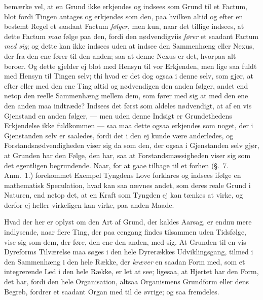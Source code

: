 \documentclass[12pt,a4paper]{book}
\newcommand{\apage}[1]{\marginnote{\footnotesize\textit{[#1]}}}
\begin{document}
bemærke vel, at en Grund ikke erkjendes og indsees som Grund til et Factum, blot
fordi Tingen antages og erkjendes som den, paa hvilken altid og efter en \apage{94} bestemt
Regel et saadant Factum \emph{følger}, men kun, naar det tillige indsees, at dette Factum
\emph{maa} følge paa den, fordi den nødvendigviis \emph{fører} et saadant Factum \emph{med sig}; og
dette kan ikke indsees uden at indsee den Sammenhæng eller Nexus, der fra den ene
fører til den anden; saa at denne Nexus er det, hvorpaa alt beroer. Og dette
gjelder ej blot med Hensyn til vor Erkjenden, men lige saa fuldt med Hensyn til
Tingen selv; thi hvad er det dog ogsaa i denne selv, som gjør, at efter eller med
den ene Ting altid og nødvendigen den anden følger, andet end netop den reelle
Sammenhæng mellem dem, som fører med sig at med den ene den anden maa indtræde?
Indsees det først som aldeles nødvendigt, at af en vis Gjenstand en anden følger,
--- men uden denne Indsigt er Grundethedens Erkjendelse ikke fuldkommen --- saa
maa dette ogsaa erkjendes som noget, der i Gjenstanden selv er saaledes, fordi det
i den ej kunde være anderledes, og Forstandsnødvendigheden viser sig da som den,
der ogsaa i Gjenstanden selv gjør, at Grunden har den Følge, den har, saa at
Forstandsmæssigheden viser sig som det egentligen begrundende. Naar, for at gaae
tilbage til et forhen (§.~7. Anm.~1.) forekommet Exempel Tyngdens Love forklares
og indsees ifølge en mathematisk Speculation, hvad kan saa nævnes andet, som
deres reale Grund i Naturen, end netop det, at en  \apage{95} Kraft som Tyngden ej kan tænkes
at virke, og derfor ej heller virkeligen kan virke, paa anden Maade.

Hvad der her er oplyst om den Art af Grund, der kaldes Aarsag, er endnu mere
indlysende, naar flere Ting, der paa eengang findes tilsammen uden Tidsfølge, vise
sig som dem, der føre, den ene den anden, med sig. At Grunden til en vis Dyreforms
Tilværelse maa søges i den hele Dyrerækkes Udviklingsgang, tilmed i den Sammenhæng
i den hele Række, der \emph{kræver} en saadan Form med, som et integrerende Led i den
hele Række, er let at see; ligesaa, at Hjertet har den Form, det har, fordi den
hele Organisation, altsaa Organismens Grundform eller dens Begreb, fordrer et
saadant Organ med til de øvrige; og saa fremdeles.
\end{document}
